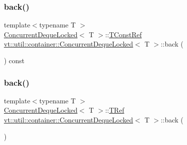 \mbox{\label{structvt_1_1util_1_1container_1_1_concurrent_deque_locked_a1722e76798cd9b6629f111814035e29a}} 
\subsubsection{\texorpdfstring{back()}{back()}\hspace{0.1cm}{\footnotesize\ttfamily [1/2]}}
{\footnotesize\ttfamily template$<$typename T $>$ \\
\hyperlink{structvt_1_1util_1_1container_1_1_concurrent_deque_locked}{Concurrent\+Deque\+Locked}$<$ T $>$\+::\hyperlink{structvt_1_1util_1_1container_1_1_concurrent_deque_locked_a9da9776dff836c013a95431f3ab15e35}{T\+Const\+Ref} \hyperlink{structvt_1_1util_1_1container_1_1_concurrent_deque_locked}{vt\+::util\+::container\+::\+Concurrent\+Deque\+Locked}$<$ T $>$\+::back (\begin{DoxyParamCaption}{ }\end{DoxyParamCaption}) const}

\mbox{\label{structvt_1_1util_1_1container_1_1_concurrent_deque_locked_ad38ab2b6cb582a65107ef74bcf678f09}} 
\subsubsection{\texorpdfstring{back()}{back()}\hspace{0.1cm}{\footnotesize\ttfamily [2/2]}}
{\footnotesize\ttfamily template$<$typename T $>$ \\
\hyperlink{structvt_1_1util_1_1container_1_1_concurrent_deque_locked}{Concurrent\+Deque\+Locked}$<$ T $>$\+::\hyperlink{structvt_1_1util_1_1container_1_1_concurrent_deque_locked_a4451b0e7f6c8aa741f98a77a9fed353e}{T\+Ref} \hyperlink{structvt_1_1util_1_1container_1_1_concurrent_deque_locked}{vt\+::util\+::container\+::\+Concurrent\+Deque\+Locked}$<$ T $>$\+::back (\begin{DoxyParamCaption}{ }\end{DoxyParamCaption})}

